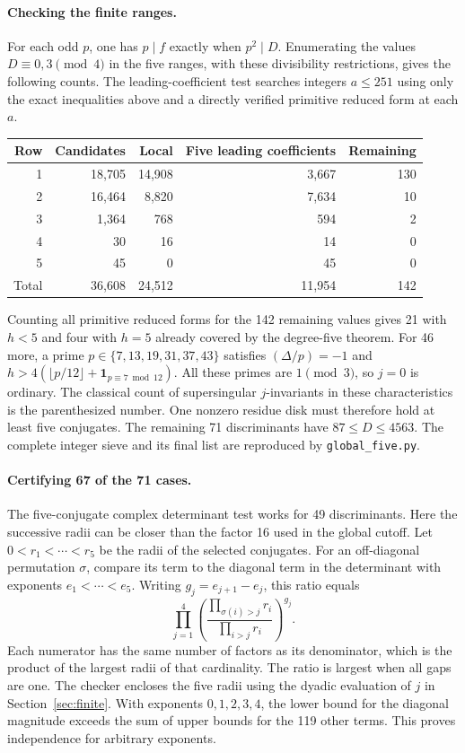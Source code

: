 \paragraph{Checking the finite ranges.}
For each odd $p$, one has $p\mid f$ exactly when $p^2\mid D$.
Enumerating the values $D\equiv0,3\pmod4$ in the five ranges, with
these divisibility restrictions, gives the following counts.
The leading-coefficient test searches integers $a\le251$ using only
the exact inequalities above and a directly verified primitive
reduced form at each $a$.
\begin{center}\small
\begin{tabular}{rrrrr}
\toprule
Row & Candidates & Local & Five leading coefficients & Remaining\\
\midrule
1 &18,705&14,908&3,667&130\\
2 &16,464& 8,820&7,634&10\\
3 & 1,364&   768&  594&2\\
4 &    30&    16&   14&0\\
5 &    45&     0&   45&0\\
\midrule
Total &36,608&24,512&11,954&142\\
\bottomrule
\end{tabular}
\end{center}
Counting all primitive reduced forms for the 142 remaining values
gives 21 with $h<5$ and four with $h=5$ already covered by the
degree-five theorem. For 46 more, a prime
$p\in\{7,13,19,31,37,43\}$ satisfies
$(\Delta/p)=-1$ and $h>4(\lfloor p/12\rfloor+
\mathbf1_{p\equiv7\bmod12})$. All these primes are $1\pmod3$,
so $j=0$ is ordinary. The classical count of supersingular $j$-invariants
in these characteristics is the parenthesized number. One nonzero
residue disk must therefore hold at least five conjugates. The
remaining 71 discriminants have $87\le D\le4563$.
The complete integer sieve and its final list are reproduced by
\texttt{global\_five.py}.

\paragraph{Certifying 67 of the 71 cases.}
The five-conjugate complex determinant test works for 49 discriminants.
Here the successive radii can be closer than the factor 16 used in the global cutoff.
Let $0<r_1<\cdots<r_5$ be the radii of the selected conjugates.
For an off-diagonal permutation $\sigma$, compare its term to the diagonal term
in the determinant with exponents $e_1<\cdots<e_5$.
Writing $g_j=e_{j+1}-e_j$, this ratio equals
\[
 \prod_{j=1}^4
 \left(\frac{\prod_{\sigma(i)>j}r_i}{\prod_{i>j}r_i}\right)^{g_j}.
\]
Each numerator has the same number of factors as its denominator, which is the product of the largest radii of that cardinality. The ratio is largest when all gaps are one. The checker encloses the five radii using the dyadic evaluation of $j$ in Section~\ref{sec:finite}. With exponents $0,1,2,3,4$, the lower bound for the diagonal magnitude exceeds the sum of upper bounds for the 119 other terms. This proves independence for arbitrary exponents.

